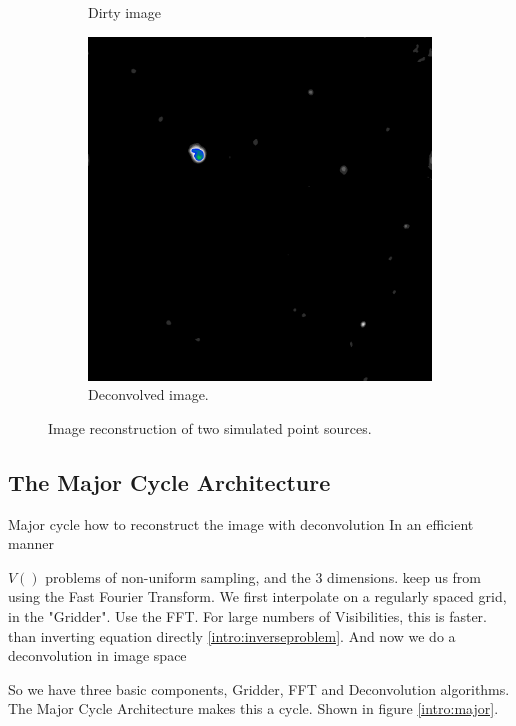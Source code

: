 \begin{figure}[h]
\begin{subfigure}[b]{0.3\linewidth}
		\caption{Dirty image}
		\label{results:points:tclean}
	\end{subfigure}
	\begin{subfigure}[b]{0.3\linewidth}
		\includegraphics[width=\linewidth]{./chapters/01.intro/mk2/clean.png}
		\caption{Deconvolved image.}
		\label{results:points:tclean}
	\end{subfigure}
	
	
	\caption{Image reconstruction of two simulated point sources.}
	\label{results:points}
\end{figure}




\subsection{The Major Cycle Architecture}
Major cycle how to reconstruct the image with deconvolution
In an efficient manner

$V()$ problems of non-uniform sampling, and the 3 dimensions. keep us from using the Fast Fourier Transform.
We first interpolate on a regularly spaced grid, in the "Gridder".
Use the FFT. For large numbers of Visibilities, this is faster. than inverting equation directly \eqref{intro:inverseproblem}.
And now we do a deconvolution in image space

So we have three basic components, Gridder, FFT and Deconvolution algorithms.
The Major Cycle Architecture makes this a cycle.
Shown in figure \ref{intro:major}.

